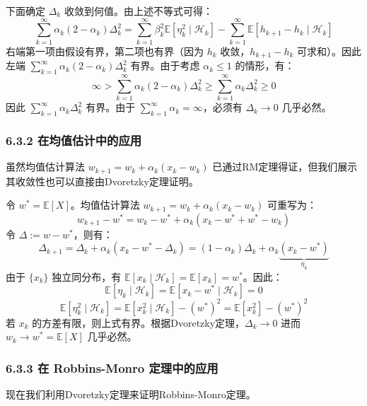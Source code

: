 \documentclass[UTF8]{article}
\begin{document}
\begin{proofbox}
    下面确定 $\Delta_k$ 收敛到何值。由上述不等式可得：
    \[
    \sum_{k=1}^{\infty} \alpha_k(2 - \alpha_k)\Delta_k^2 = \sum_{k=1}^{\infty} \beta_k^2 \mathbb{E}[\eta_k^2 \mid \mathcal{H}_k] - \sum_{k=1}^{\infty} \mathbb{E}[h_{k+1} - h_k \mid \mathcal{H}_k]
    \]
    右端第一项由假设有界，第二项也有界（因为 $h_k$ 收敛，$h_{k+1} - h_k$ 可求和）。因此左端 $\sum_{k=1}^{\infty} \alpha_k(2 - \alpha_k)\Delta_k^2$ 有界。由于考虑 $\alpha_k \leq 1$ 的情形，有：
    \[
    \infty > \sum_{k=1}^{\infty} \alpha_k(2 - \alpha_k)\Delta_k^2 \geq \sum_{k=1}^{\infty} \alpha_k \Delta_k^2 \geq 0
    \]
    因此 $\sum_{k=1}^{\infty} \alpha_k \Delta_k^2$ 有界。由于 $\sum_{k=1}^{\infty} \alpha_k = \infty$，必须有 $\Delta_k \to 0$ 几乎必然。
\end{proofbox}

\subsubsection*{6.3.2 在均值估计中的应用}

虽然均值估计算法 $w_{k+1} = w_k + \alpha_k(x_k - w_k)$ 已通过RM定理得证，但我们展示其收敛性也可以直接由Dvoretzky定理证明。

\begin{proofbox}
    令 $w^* = \mathbb{E}[X]$。均值估计算法 $w_{k+1} = w_k + \alpha_k(x_k - w_k)$ 可重写为：
    \[
    w_{k+1} - w^* = w_k - w^* + \alpha_k(x_k - w^* + w^* - w_k)
    \]
    令 $\Delta := w - w^*$，则有：
    \[
    \Delta_{k+1} = \Delta_k + \alpha_k(x_k - w^* - \Delta_k) = (1 - \alpha_k)\Delta_k + \alpha_k\underbrace{(x_k - w^*)}_{\eta_k}
    \]
    由于 $\{x_k\}$ 独立同分布，有 $\mathbb{E}[x_k \mid \mathcal{H}_k] = \mathbb{E}[x_k] = w^*$。因此：
    \[
    \mathbb{E}[\eta_k \mid \mathcal{H}_k] = \mathbb{E}[x_k - w^* \mid \mathcal{H}_k] = 0
    \]
    \[
    \mathbb{E}[\eta_k^2 \mid \mathcal{H}_k] = \mathbb{E}[x_k^2 \mid \mathcal{H}_k] - (w^*)^2 = \mathbb{E}[x_k^2] - (w^*)^2
    \]
    若 $x_k$ 的方差有限，则上式有界。根据Dvoretzky定理，$\Delta_k \to 0$ 进而 $w_k \to w^* = \mathbb{E}[X]$ 几乎必然。
\end{proofbox}

\subsubsection*{6.3.3 在 Robbins-Monro 定理中的应用}

现在我们利用Dvoretzky定理来证明Robbins-Monro定理。
\end{document}
